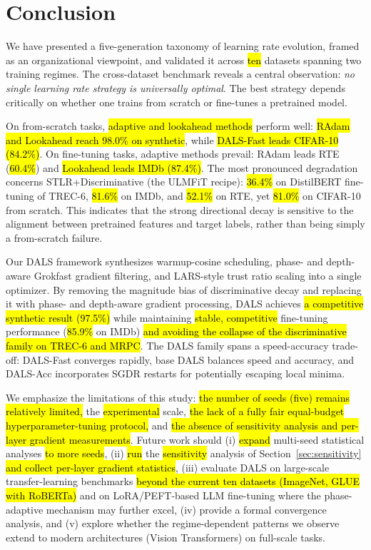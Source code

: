 \documentclass[a4paper,fleqn]{cas-dc}
\begin{document}
\section{Conclusion}\label{sec:conclusion}

We have presented a five-generation taxonomy of learning rate evolution, framed as an organizational viewpoint, and validated it across \hl{ten} datasets spanning two training regimes. The cross-dataset benchmark reveals a central observation: \emph{no single learning rate strategy is universally optimal}. The best strategy depends critically on whether one trains from scratch or fine-tunes a pretrained model.

On from-scratch tasks, \hl{adaptive and lookahead methods} perform well: \hl{RAdam and Lookahead reach 98.0\% on synthetic}, while \hl{DALS-Fast leads CIFAR-10 (84.2\%)}. On fine-tuning tasks, adaptive methods prevail: RAdam leads RTE (\hl{60.4\%}) and \hl{Lookahead leads IMDb (87.4\%)}. The most pronounced degradation concerns STLR+Discriminative (the ULMFiT recipe): \hl{36.4\%} on DistilBERT fine-tuning of TREC-6, \hl{81.6\%} on IMDb, and \hl{52.1\%} on RTE, yet \hl{81.0\%} on CIFAR-10 from scratch. This indicates that the strong directional decay is sensitive to the alignment between pretrained features and target labels, rather than being simply a from-scratch failure.

Our DALS framework synthesizes warmup-cosine scheduling, phase- and depth-aware Grokfast gradient filtering, and LARS-style trust ratio scaling into a single optimizer. By removing the magnitude bias of discriminative decay and replacing it with phase- and depth-aware gradient processing, DALS achieves \hl{a competitive synthetic result (97.5\%)} while maintaining \hl{stable, competitive} fine-tuning performance (\hl{85.9\%} on IMDb) \hl{and avoiding the collapse of the discriminative family on TREC-6 and MRPC}. The DALS family spans a speed-accuracy trade-off: DALS-Fast converges rapidly, base DALS balances speed and accuracy, and DALS-Acc incorporates SGDR restarts for potentially escaping local minima.

We emphasize the limitations of this study: \hl{the number of seeds (five) remains relatively limited,} the \hl{experimental} scale, \hl{the lack of a fully fair equal-budget hyperparameter-tuning protocol,} and \hl{the absence of sensitivity analysis and per-layer gradient measurements}. Future work should (i) \hl{expand} multi-seed statistical analyses \hl{to more seeds}, (ii) \hl{run} the \hl{sensitivity} analysis of Section~\ref{sec:sensitivity} \hl{and collect per-layer gradient statistics}, (iii) evaluate DALS on large-scale transfer-learning benchmarks \hl{beyond the current ten datasets (ImageNet, GLUE with RoBERTa)} and on LoRA/PEFT-based LLM fine-tuning where the phase-adaptive mechanism may further excel, (iv) provide a formal convergence analysis, and (v) explore whether the regime-dependent patterns we observe extend to modern architectures (Vision Transformers) on full-scale tasks.
\end{document}
